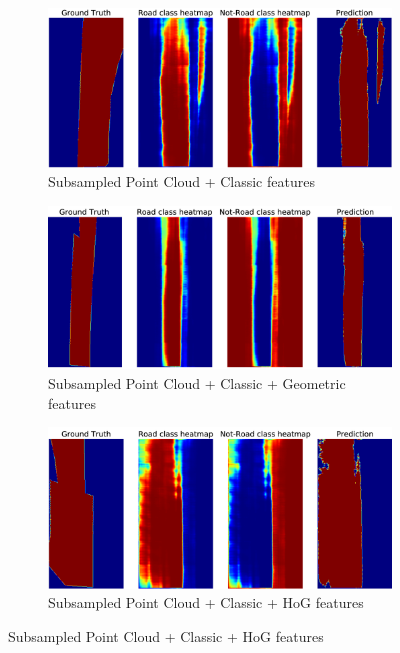 \documentclass[10pt,twocolumn,letterpaper]{article}
\begin{document}
 \begin{figure}[!th]
  \centering
  \begin{subfigure}[b]{\columnwidth}
    \includegraphics[width=\columnwidth]{pred_classic_sub.png}
    \caption{Subsampled Point Cloud + Classic features}
  \end{subfigure}
  
  \begin{subfigure}[b]{\columnwidth}
    \includegraphics[width=\columnwidth]{pred_classic_geom_sub.png}
    \caption{Subsampled Point Cloud + Classic + Geometric features}
  \end{subfigure}
  
  \begin{subfigure}[b]{\columnwidth}
    \includegraphics[width=\columnwidth]{pred_classic_sub_hog.png}
    \caption{Subsampled Point Cloud + Classic + HoG features}
  \end{subfigure}
  

\end{figure}
\end{document}
